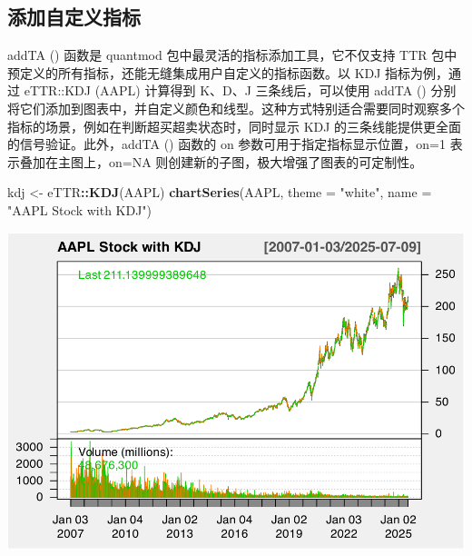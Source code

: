 \documentclass[]{ctexbook}
\newenvironment{Shaded}{\begin{snugshade}}{\end{snugshade}}
\newcommand{\AttributeTok}[1]{\textcolor[rgb]{0.13,0.29,0.53}{#1}}
\newcommand{\CommentTok}[1]{\textcolor[rgb]{0.56,0.35,0.01}{\textit{#1}}}
\newcommand{\FunctionTok}[1]{\textcolor[rgb]{0.13,0.29,0.53}{\textbf{#1}}}
\newcommand{\NormalTok}[1]{#1}
\newcommand{\OtherTok}[1]{\textcolor[rgb]{0.56,0.35,0.01}{#1}}
\newcommand{\SpecialCharTok}[1]{\textcolor[rgb]{0.81,0.36,0.00}{\textbf{#1}}}
\newcommand{\StringTok}[1]{\textcolor[rgb]{0.31,0.60,0.02}{#1}}
\begin{document}
\subsection{添加自定义指标}\label{ux6dfbux52a0ux81eaux5b9aux4e49ux6307ux6807}

addTA () 函数是 quantmod 包中最灵活的指标添加工具，它不仅支持 TTR 包中预定义的所有指标，还能无缝集成用户自定义的指标函数。以 KDJ 指标为例，通过 eTTR::KDJ (AAPL) 计算得到 K、D、J 三条线后，可以使用 addTA () 分别将它们添加到图表中，并自定义颜色和线型。这种方式特别适合需要同时观察多个指标的场景，例如在判断超买超卖状态时，同时显示 KDJ 的三条线能提供更全面的信号验证。此外，addTA () 函数的 on 参数可用于指定指标显示位置，on=1 表示叠加在主图上，on=NA 则创建新的子图，极大增强了图表的可定制性。

\begin{Shaded}
\begin{Highlighting}[]
\NormalTok{kdj }\OtherTok{\textless{}{-}}\NormalTok{ eTTR}\SpecialCharTok{::}\FunctionTok{KDJ}\NormalTok{(AAPL)}
\FunctionTok{chartSeries}\NormalTok{(AAPL, }\AttributeTok{theme =} \StringTok{"white"}\NormalTok{, }\AttributeTok{name =} \StringTok{"AAPL Stock with KDJ"}\NormalTok{)}
\end{Highlighting}
\end{Shaded}

\includegraphics[width=0.9\linewidth]{quantmod_files/figure-latex/defi-1}

\begin{Shaded}
\end{Shaded}
\end{document}
